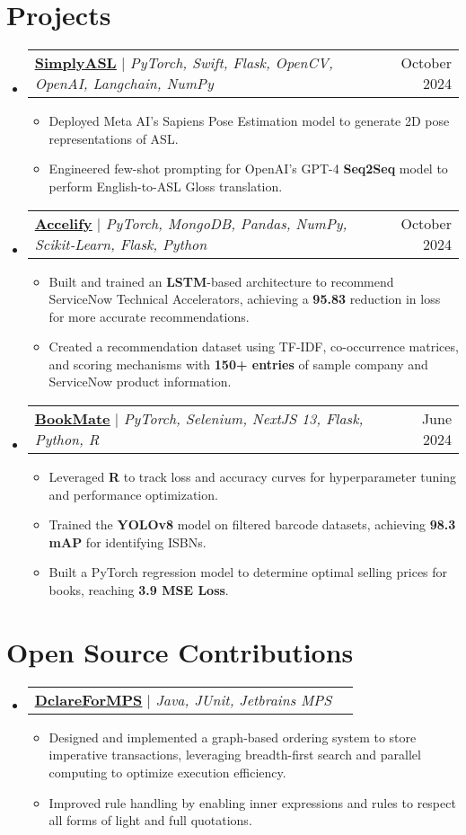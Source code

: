 \documentclass[letterpaper,11pt]{article}
\makeatletter
\newcommand{\resumeItem}[1]{
  \item\small{
    {#1 \vspace{-2pt}}
  }
}
\newcommand{\resumeProjectHeading}[2]{
    \item
    \begin{tabular*}{0.97\textwidth}{l@{\extracolsep{\fill}}r}
      \small#1 & #2 \\
    \end{tabular*}\vspace{-7pt}
}
\newcommand{\resumeSubHeadingListStart}{\begin{itemize}[leftmargin=0.15in, label={}]}
\newcommand{\resumeSubHeadingListEnd}{\end{itemize}}
\newcommand{\resumeItemListStart}{\begin{itemize}}
\newcommand{\resumeItemListEnd}{\end{itemize}\vspace{-5pt}}
\makeatother
\begin{document}
\section{Projects}
  \resumeSubHeadingListStart
    \resumeProjectHeading
      {\faGithub\hspace{0.25pt} \href{https://github.com/DRobinson4105/Simply-ASL}{\textbf{\uline{SimplyASL}}} $|$ \emph{PyTorch, Swift, Flask, OpenCV, OpenAI, Langchain, NumPy}}{October 2024}
      \resumeItemListStart
        \resumeItem{Deployed Meta AI’s Sapiens Pose Estimation model to generate 2D pose representations of ASL.}
        \resumeItem{Engineered few-shot prompting for OpenAI's GPT-4 \textbf{Seq2Seq} model to perform English-to-ASL Gloss translation.}
      \resumeItemListEnd
    \resumeProjectHeading
      {\faGithub\hspace{0.25pt} \href{https://github.com/DRobinson4105/accelify}{\textbf{\uline{Accelify}}} $|$ \emph{PyTorch, MongoDB, Pandas, NumPy, Scikit-Learn, Flask, Python}}{October 2024}
      \resumeItemListStart
        \resumeItem{Built and trained an \textbf{LSTM}-based architecture to recommend ServiceNow Technical Accelerators, achieving a \textbf{95.83} reduction in loss for more accurate recommendations.}
        \resumeItem{Created a recommendation dataset using TF-IDF, co-occurrence matrices, and scoring mechanisms with \textbf{150+ entries} of sample company and ServiceNow product information.}
      \resumeItemListEnd
    \resumeProjectHeading
      {\faGithub\hspace{0.25pt} \href{https://github.com/DRobinson4105/bookmate}{\textbf{\uline{BookMate}}} $|$ \emph{PyTorch, Selenium, NextJS 13, Flask, Python, R}}{June 2024}
      \resumeItemListStart
        \resumeItem{Leveraged \textbf{R} to track loss and accuracy curves for hyperparameter tuning and performance optimization.}
        \resumeItem{Trained the \textbf{YOLOv8} model on filtered barcode datasets, achieving \textbf{98.3 mAP} for identifying ISBNs.}
        \resumeItem{Built a PyTorch regression model to determine optimal selling prices for books, reaching \textbf{3.9 MSE Loss}.}
      \resumeItemListEnd
  \resumeSubHeadingListEnd

\section{Open Source Contributions}
  \resumeSubHeadingListStart
    \resumeProjectHeading
      {\faGithub\hspace{0.25pt} \href{https://github.com/ModelingValueGroup/dclareForMPS}{\textbf{\uline{DclareForMPS}}} $|$ \emph{Java, JUnit, Jetbrains MPS}}{}
      \resumeItemListStart
        \resumeItem{Designed and implemented a graph-based ordering system to store imperative transactions, leveraging breadth-first search and parallel computing to optimize execution efficiency.}
        \resumeItem{Improved rule handling by enabling inner expressions and rules to respect all forms of light and full quotations.}
      \resumeItemListEnd
  \resumeSubHeadingListEnd
\end{document}
